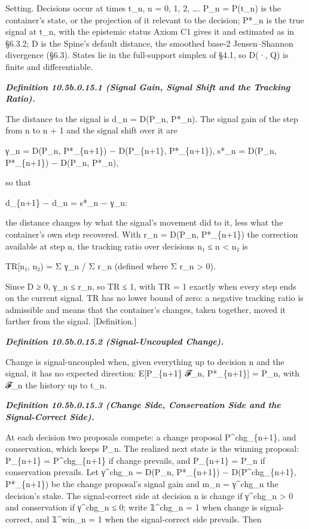 \documentclass[
]{article}
\begin{document}
Setting. Decisions occur at times t\_n, n = 0, 1, 2, \ldots. P\_n =
P(t\_n) is the container's state, or the projection of it relevant to
the decision; P*\_n is the true signal at t\_n, with the epistemic
status Axiom C1 gives it and estimated as in §6.3.2; D is the Spine's
default distance, the smoothed base-2 Jensen--Shannon divergence (§6.3).
States lie in the full-support simplex of §4.1, so D(·, Q) is finite and
differentiable.

\emph{\textbf{Definition 10.5b.0.15.1 (Signal Gain, Signal Shift and the
Tracking Ratio).}}

The distance to the signal is d\_n = D(P\_n, P*\_n). The signal gain of
the step from n to n + 1 and the signal shift over it are

γ\_n = D(P\_n, P*\_\{n+1\}) − D(P\_\{n+1\}, P*\_\{n+1\}), s*\_n =
D(P\_n, P*\_\{n+1\}) − D(P\_n, P*\_n),

so that

d\_\{n+1\} − d\_n = s*\_n − γ\_n:

the distance changes by what the signal's movement did to it, less what
the container's own step recovered. With r\_n = D(P\_n, P*\_\{n+1\}) the
correction available at step n, the tracking ratio over decisions n₁ ≤ n
\textless{} n₂ is

TR{[}n₁, n₂) = Σ γ\_n / Σ r\_n (defined where Σ r\_n \textgreater{} 0).

Since D ≥ 0, γ\_n ≤ r\_n, so TR ≤ 1, with TR = 1 exactly when every step
ends on the current signal. TR has no lower bound of zero: a negative
tracking ratio is admissible and means that the container's changes,
taken together, moved it farther from the signal. {[}Definition.{]}

\emph{\textbf{Definition 10.5b.0.15.2 (Signal-Uncoupled Change).}}

Change is signal-uncoupled when, given everything up to decision n and
the signal, it has no expected direction: E{[}P\_\{n+1\} \textbar{}
𝓕\_n, P*\_\{n+1\}{]} = P\_n, with 𝓕\_n the history up to t\_n.

\emph{\textbf{Definition 10.5b.0.15.3 (Change Side, Conservation Side
and the Signal-Correct Side).}}

At each decision two proposals compete: a change proposal
P\^{}chg\_\{n+1\}, and conservation, which keeps P\_n. The realized next
state is the winning proposal: P\_\{n+1\} = P\^{}chg\_\{n+1\} if change
prevails, and P\_\{n+1\} = P\_n if conservation prevails. Let
γ\^{}chg\_n = D(P\_n, P*\_\{n+1\}) − D(P\^{}chg\_\{n+1\}, P*\_\{n+1\})
be the change proposal's signal gain and m\_n =
\textbar γ\^{}chg\_n\textbar{} the decision's stake. The signal-correct
side at decision n is change if γ\^{}chg\_n \textgreater{} 0 and
conservation if γ\^{}chg\_n ≤ 0; write 𝟙\^{}chg\_n = 1 when change is
signal-correct, and 𝟙\^{}win\_n = 1 when the signal-correct side
prevails. Then
\end{document}
